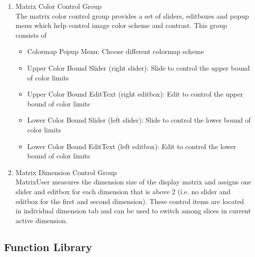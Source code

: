\documentclass{book}%
\begin{document}
\begin{enumerate}
	\item Matrix Color Control Group \\
	
	The matrix color control group provides a set of sliders, editboxes and popup menu which help control image color scheme and contrast. This group consists of
	
	\begin{itemize}
		\item Colormap Popup Menu: Choose different colormap scheme
		\item Upper Color Bound Slider (right slider): Slide to control the upper bound of color limits
		\item Upper Color Bound EditText (right editbox): Edit to control the upper bound of color limits
		\item Lower Color Bound Slider (left slider): Slide to control the lower bound of color limits
		\item Lower Color Bound EditText (left editbox): Edit to control the lower bound of color limits
	\end{itemize}
	
	\item Matrix Dimension Control Group \\
	
	MatrixUser measures the dimension size of the display matrix and assigns one slider and editbox for each dimension that is above 2 (i.e. no slider and editbox for the first and second dimension). These control items are located in individual dimension tab and can be used to switch among slices in current active dimension.
	
	\end{enumerate}
	
\subsection{Function Library}
	
\end{document}
